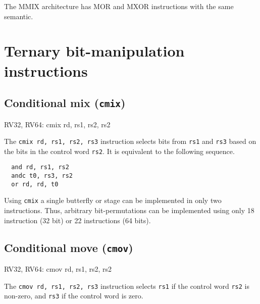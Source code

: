 The MMIX architecture has MOR and MXOR instructions with the same semantic.~\cite[p.~182f]{Knuth4A}




\section{Ternary bit-manipulation instructions}


\subsection{Conditional mix ({\tt cmix})}

\begin{rvb}
  RV32, RV64:
    cmix rd, rs1, rs2, rs2
\end{rvb}

The {\tt cmix rd, rs1, rs2, rs3} instruction selects bits from {\tt rs1} and {\tt rs3} based
on the bits in the control word {\tt rs2}. It is equivalent to the following sequence.

\begin{minipage}{\linewidth}
\begin{verbatim}
  and rd, rs1, rs2
  andc t0, rs3, rs2
  or rd, rd, t0
\end{verbatim}
\end{minipage}

Using {\tt cmix} a single butterfly or stage can be implemented in only two
instructions. Thus, arbitrary bit-permutations can be implemented using only
18 instruction (32 bit) or 22 instructions (64 bits).



\subsection{Conditional move ({\tt cmov})}

\begin{rvb}
  RV32, RV64:
    cmov rd, rs1, rs2, rs2
\end{rvb}

The {\tt cmov rd, rs1, rs2, rs3} instruction selects {\tt rs1} if the control
word {\tt rs2} is non-zero, and {\tt rs3} if the control word is zero.

